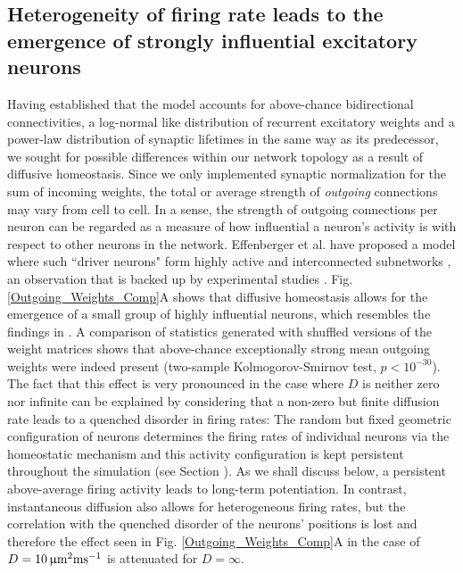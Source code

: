 \documentclass[10pt,letterpaper]{article}
\begin{document}
\subsection*{Heterogeneity of firing rate leads to the emergence of strongly influential excitatory neurons}\label{Section_Mean_outgoing_Weights}
Having established that the model accounts for above-chance bidirectional connectivities, a log-normal like distribution of recurrent excitatory weights and a power-law distribution of synaptic lifetimes in the same way as its predecessor, we sought for possible differences within our network topology as a result of diffusive homeostasis. Since we only implemented synaptic normalization for the sum of incoming weights, the total or average strength of \emph{outgoing} connections may vary from cell to cell. In a sense, the strength of outgoing connections per neuron can be regarded as a measure of how influential a neuron's activity is with respect to other neurons in the network. Effenberger et al. have proposed a model where such ``driver neurons" form highly active and interconnected subnetworks \cite{Effenberger_2015}, an observation that is backed up by experimental studies \cite{Yassin_Subnetworks_2010,Eckmann_Leader_Neurons_2008}. Fig. \ref{Outgoing_Weights_Comp}A shows that diffusive homeostasis allows for the emergence of a small group of highly influential neurons, which resembles the findings in \cite{Effenberger_2015}. A comparison of statistics generated with shuffled versions of the weight matrices shows that above-chance exceptionally strong mean outgoing weights were indeed present (two-sample Kolmogorov-Smirnov test, $p < 10^{-30}$). The fact that this effect is very pronounced in the case where $D$ is neither zero nor infinite can be explained by considering that a non-zero but finite diffusion rate leads to a quenched disorder in firing rates: The random but fixed geometric configuration of neurons determines the firing rates of individual neurons via the homeostatic mechanism and this activity configuration is kept persistent throughout the simulation (see Section \textit{}). As we shall discuss below, a persistent above-average firing activity leads to long-term potentiation. In contrast, instantaneous diffusion also allows for heterogeneous firing rates, but the correlation with the quenched disorder of the neurons' positions is lost and therefore the effect seen in Fig. \ref{Outgoing_Weights_Comp}A in the case of $D=\rm 10\,\upmu m^2 ms^{-1}$ is attenuated for $D=\infty$. 
\end{document}

